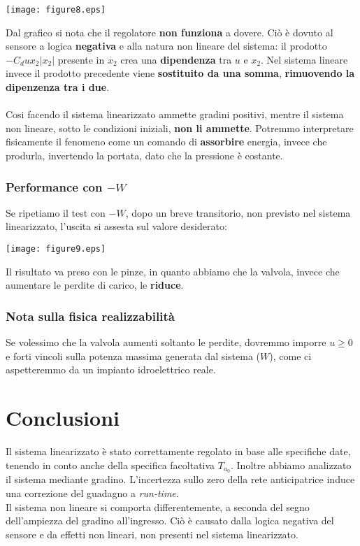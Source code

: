 \documentclass{article}
\begin{document}
\begin{center}
    \texttt{[image: figure8.eps]}
\end{center}

Dal grafico si nota che il regolatore \textbf{non funziona} a dovere. Ciò è dovuto al sensore a logica \textbf{negativa} e alla natura non lineare del sistema: il prodotto $-C_d u x_2 |x_2|$ presente in $\dot{x_2}$ crea una \textbf{dipendenza} tra $u$ e $x_2$. Nel sistema lineare invece il prodotto precedente viene \textbf{sostituito da una somma}, \textbf{rimuovendo la dipenzenza tra i due}.\\\\
Cosi facendo il sistema linearizzato ammette gradini positivi, mentre il sistema non lineare, sotto le condizioni iniziali, \textbf{non li ammette}. Potremmo interpretare fisicamente il fenomeno come un comando di \textbf{assorbire} energia, invece che produrla, invertendo la portata, dato che la pressione è costante.

\newpage

\subsubsection{Performance con $-W$}

Se ripetiamo il test con $-W$, dopo un breve transitorio, non previsto nel sistema linearizzato, l'uscita si assesta sul valore desiderato:

\begin{center}
    \texttt{[image: figure9.eps]}
\end{center}

Il risultato va preso con le pinze, in quanto abbiamo che la valvola, invece che aumentare le perdite di carico, le \textbf{riduce}.

\subsubsection{Nota sulla fisica realizzabilità}
Se volessimo che la valvola aumenti soltanto le perdite, dovremmo imporre $u\geq0$ e forti vincoli sulla potenza massima generata dal sistema ($W$), come ci aspetteremmo da un impianto idroelettrico reale.

\section{Conclusioni}

Il sistema linearizzato è stato correttamente regolato in base alle specifiche date, tenendo in conto anche della specifica facoltativa $T_{a_0}$. Inoltre abbiamo analizzato il sistema mediante gradino. L'incertezza sullo zero della rete anticipatrice induce una correzione del guadagno a \textit{run-time}.\\

Il sistema non lineare si comporta differentemente, a seconda del segno dell'ampiezza del gradino all'ingresso. Ciò è causato dalla logica negativa del sensore e da effetti non lineari, non presenti nel sistema linearizzato.
\end{document}
